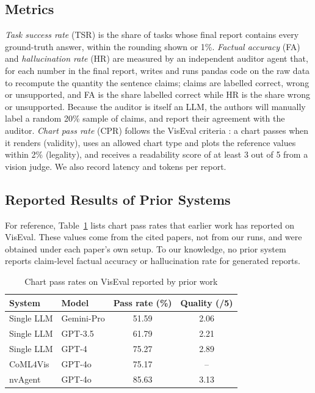\documentclass[conference]{IEEEtran}
\begin{document}
\subsection{Metrics}
\textit{Task success rate} (TSR) is the share of tasks whose final report contains every ground-truth answer, within the rounding shown or 1\%. \textit{Factual accuracy} (FA) and \textit{hallucination rate} (HR) are measured by an independent auditor agent that, for each number in the final report, writes and runs pandas code on the raw data to recompute the quantity the sentence claims; claims are labelled correct, wrong or unsupported, and FA is the share labelled correct while HR is the share wrong or unsupported. Because the auditor is itself an LLM, the authors will manually label a random 20\% sample of claims, and report their agreement with the auditor. \textit{Chart pass rate} (CPR) follows the VisEval criteria \cite{chen2025viseval}: a chart passes when it renders (validity), uses an allowed chart type and plots the reference values within 2\% (legality), and receives a readability score of at least 3 out of 5 from a vision judge. We also record latency and tokens per report.

\subsection{Reported Results of Prior Systems}
For reference, Table~\ref{tab:prior} lists chart pass rates that earlier work has reported on VisEval. These values come from the cited papers, not from our runs, and were obtained under each paper's own setup. To our knowledge, no prior system reports claim-level factual accuracy or hallucination rate for generated reports.

\begin{table}[t]
\centering
\caption{Chart pass rates on VisEval reported by prior work}
\label{tab:prior}
\setlength{\tabcolsep}{4pt}
\begin{tabular}{@{}llcc@{}}
\toprule
System & Model & Pass rate (\%) & Quality (/5) \\
\midrule
Single LLM \cite{chen2025viseval} & Gemini-Pro & 51.59 & 2.06 \\
Single LLM \cite{chen2025viseval} & GPT-3.5    & 61.79 & 2.21 \\
Single LLM \cite{chen2025viseval} & GPT-4      & 75.27 & 2.89 \\
CoML4Vis \cite{nvagent2025}       & GPT-4o     & 75.17 & --   \\
nvAgent \cite{nvagent2025}        & GPT-4o     & 85.63 & 3.13 \\
\bottomrule
\end{tabular}
\end{table}
\end{document}

